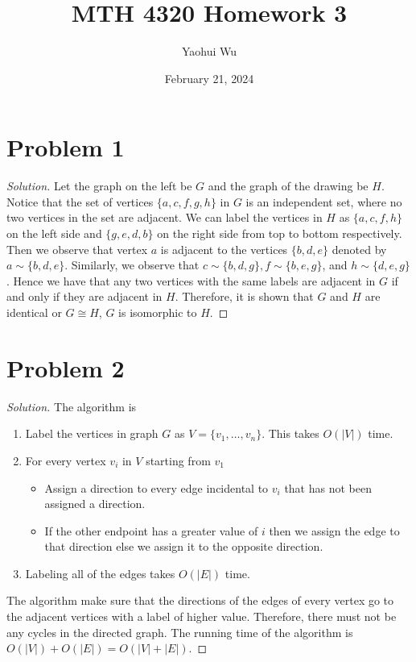 \documentclass[12pt]{article}
\title{MTH 4320 Homework 3}
\author{Yaohui Wu}
\date{February 21, 2024}
\newenvironment{solution}{\begin{proof}[Solution]}{\end{proof}}
\begin{document}
\maketitle
\section*{Problem 1}
\begin{solution}
    Let the graph on the left be \(G\) and the graph of the drawing be \(H\).
    Notice that the set of vertices \(\{a,c,f,g,h\}\) in \(G\) is an independent
    set, where no two vertices in the set are adjacent. We can label the vertices
    in \(H\) as \(\{a,c,f,h\}\) on the left side and \(\{g,e,d,b\}\) on the right
    side from top to bottom respectively. Then we observe that vertex \(a\) is
    adjacent to the vertices \(\{b,d,e\}\) denoted by \(a\sim\{b,d,e\}\).
    Similarly, we observe that \(c\sim\{b,d,g\},f\sim\{b,e,g\}\), and \(h\sim\{d,e,g\}\).
    Hence we have that any two vertices with the same labels are adjacent in \(G\)
    if and only if they are adjacent in \(H\). Therefore, it is shown that \(G\)
    and \(H\) are identical or \(G\cong H\), \(G\) is isomorphic to \(H\).
\end{solution}

\section*{Problem 2}
\begin{solution}
    The algorithm is
    \begin{enumerate}
        \item Label the vertices in graph \(G\) as \(V=\{v_1,\dots,v_n\}\).
        This takes \(O(|V|)\) time.
        \item For every vertex \(v_i\) in \(V\) starting from \(v_1\)
        \begin{itemize}
            \item Assign a direction to every edge incidental to \(v_i\) that
            has not been assigned a direction.
            \item If the other endpoint has a greater value of \(i\) then we
            assign the edge to that direction else we assign it to the opposite
            direction.
        \end{itemize}
        \item Labeling all of the edges takes \(O(|E|)\) time.
    \end{enumerate}
    The algorithm make sure that the directions of the edges of every vertex
    go to the adjacent vertices with a label of higher value. Therefore, there
    must not be any cycles in the directed graph. The running time of the
    algorithm is \(O(|V|)+O(|E|)=O(|V|+|E|)\).
\end{solution}
\end{document}
